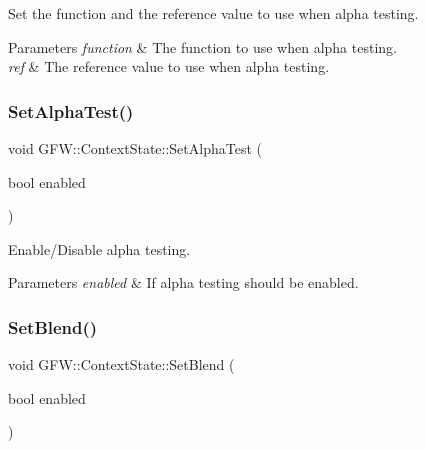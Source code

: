 Set the function and the reference value to use when alpha testing. 


\begin{DoxyParams}{Parameters}
{\em function} & The function to use when alpha testing. \\
\hline
{\em ref} & The reference value to use when alpha testing. \\
\hline
\end{DoxyParams}
\mbox{\label{class_g_f_w_1_1_context_state_a389b0eb730c3e4dfccb2ca8e733c8059}} 
\subsubsection{\texorpdfstring{Set\+Alpha\+Test()}{SetAlphaTest()}}
{\footnotesize\ttfamily void G\+F\+W\+::\+Context\+State\+::\+Set\+Alpha\+Test (\begin{DoxyParamCaption}\item[{bool}]{enabled }\end{DoxyParamCaption})}



Enable/\+Disable alpha testing. 


\begin{DoxyParams}{Parameters}
{\em enabled} & If alpha testing should be enabled. \\
\hline
\end{DoxyParams}
\mbox{\label{class_g_f_w_1_1_context_state_adfdffbd81d730021f511e4912ce2da27}} 
\subsubsection{\texorpdfstring{Set\+Blend()}{SetBlend()}}
{\footnotesize\ttfamily void G\+F\+W\+::\+Context\+State\+::\+Set\+Blend (\begin{DoxyParamCaption}\item[{bool}]{enabled }\end{DoxyParamCaption})}



